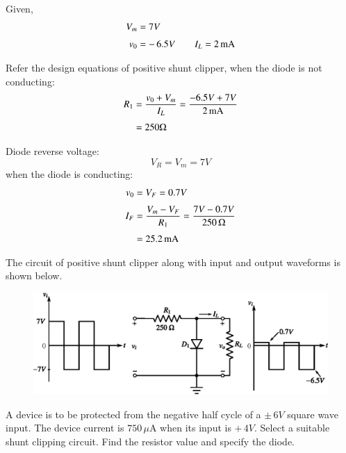 \begin{solution}
Given,
\begin{align*}
V_{m} &= 7V\\[3pt]
v_{0} &= -\,6.5V\qquad I_{L}=2\operatorname{mA}
\end{align*}

Refer the design equations of positive shunt clipper, when the diode is not conducting:
\begin{align*}
R_{1} &= \frac{v_{0}+V_{m}}{I_{L}}=\dfrac{-6.5V+7V}{2\operatorname{mA}}\\[3pt]
&= 250\Omega
\end{align*}

Diode reverse voltage:
$$
V_{R}=V_{m}=7V
$$
when the diode is conducting:
\begin{align*}
v_{0} &= V_{F}=0.7V\\[3pt]
I_{F} &= \frac{V_{m}-V_{F}}{R_{1}}=\frac{7V-0.7V}{250\,\Omega}\\[3pt]
&= 25.2\operatorname{mA}
\end{align*}

The circuit of positive shunt clipper along with input and output waveforms is shown below.
\begin{figure}[H]
\centering
\includegraphics{chap2/sol2.41.eps}
\end{figure}
\end{solution}

\begin{example}\label{exam2.42}
A device is to be protected from the negative half cycle of a $\pm\,6V$ square wave input. The device current is $750\,\mu\text{A}$ when its input is $+\,4V$. Select a suitable shunt clipping circuit. Find the resistor value and specify the diode.
\end{example}

